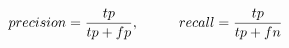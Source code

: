 \begin{equation}
\label{eq:precision_recal}
    precision = \frac{tp}{tp+fp}, 
    \hspace{10mm}
    recall = \frac{tp}{tp+fn}
\end{equation}